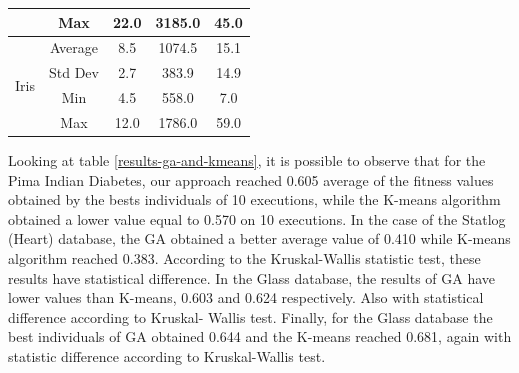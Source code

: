 \documentclass[journal]{IEEEtran}
\begin{document}
\begin{table}[]
\begin{tabular}{|c|c|c|c|c|}
			& Max                                      & 22.0                                                                                          & 3185.0                                                                                                          & 45.0                                                                                                \\ \hline
			\multirow{4}{*}{Iris}                  & Average                                  & 8.5                                                                                           & 1074.5                                                                                                          & 15.1                                                                                                \\ \cline{2-5} 
			& Std Dev                                  & 2.7                                                                                           & 383.9                                                                                                           & 14.9                                                                                                \\ \cline{2-5} 
			& Min                                      & 4.5                                                                                           & 558.0                                                                                                           & 7.0                                                                                                 \\ \cline{2-5} 
			& Max                                      & 12.0                                                                                          & 1786.0                                                                                                          & 59.0                                                                                                \\ \hline
		\end{tabular}
	\end{table}
	
	Looking at table \ref{results-ga-and-kmeans}, it is possible to observe that for the Pima Indian Diabetes, our approach reached 0.605 average of the fitness values obtained by the bests individuals of 10 executions, while the K-means algorithm obtained a lower value equal to 0.570 on 10 executions. 
	In the case of the Statlog (Heart) database,  the GA obtained a better average value of 0.410 while K-means algorithm reached 0.383. According to the  Kruskal-Wallis statistic test, these results have statistical difference. 
	In the Glass database, the results of GA have lower values than K-means, 0.603 and 0.624 respectively. Also with statistical difference according to Kruskal- Wallis test. 
	Finally, for the Glass database the best individuals of GA obtained 0.644 and the K-means reached 0.681, again with statistic difference according to Kruskal-Wallis test.
	
\end{document}

